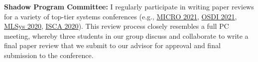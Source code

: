 \documentclass[letterpaper,11pt]{article}
\newcommand{\heading}[1]{
    \noindent
    \textsc{\textbf{#1}}
}
\newcommand*\resheading[1]{\subsection*{\heading{#1}}\vspace{0.3em}\nopagebreak[4]}
\begin{document}
\vspace{1.0em}
\noindent
\textbf{Shadow Program Committee:} 
I regularly participate in writing paper reviews for a variety of top-tier systems conferences
(e.g., 
\href{https://www.microarch.org/micro54}{MICRO 2021},
\href{https://www.usenix.org/conference/osdi21}{OSDI 2021},
\href{https://mlsys.org/Conferences/2020}{MLSys 2020},
\href{https://iscaconf.org/isca2020}{ISCA 2020}).
This review process closely resembles a full PC meeting, whereby three students in our group discuss and collaborate to write a final paper review that we submit to our advisor for approval and final submission to the conference. 

% 
% 
\end{document}
